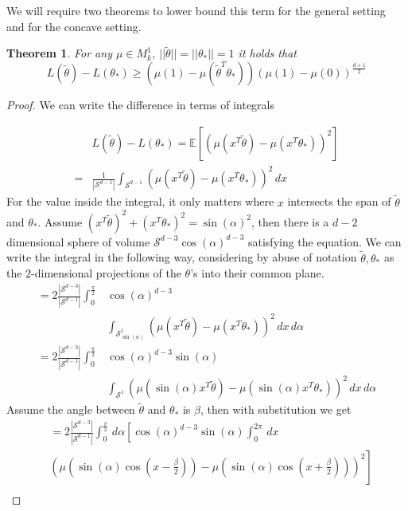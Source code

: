 \documentclass[twoside]{article} \usepackage{aistats2017}
\newcommand{\EV}[1] {
  \mathbb{E}\left[#1\right]}
\newtheorem{theorem}{Theorem}
\begin{document}
We will require two theorems to lower bound this term for the general setting and for the concave setting.
\begin{theorem}
For any $\mu \in M_k^1$, $||\tilde{\theta}||=||\theta_*||=1$ it holds that
$$L(\tilde{\theta})-L(\theta_*) \geq (\mu(1)-\mu(\tilde{\theta}^T\theta_*))(\mu(1)-\mu(0))^{\frac{d+1}{2}}$$
\end{theorem}
\begin{proof}
We can write the difference in terms of integrals

\begin{align*}
    &L(\tilde{\theta})-L(\theta_*)=\EV{(\mu(x^T\tilde{\theta})-\mu(x^T\theta_*))^2}\\
    =&\frac{1}{|\mathcal{S}^{d-1}|}\int_{\mathcal{S}^{d-1}}\left(\mu(x^T\tilde{\theta})-\mu(x^T\theta_*)\right)^2\, dx
\end{align*}
For the value inside the integral, it only matters where $x$ intersects the span of $\tilde{\theta}$ and $\theta_*$. Assume $(x^T\tilde{\theta})^2+(x^T\theta_*)^2 = \sin(\alpha)^2$, then there is a $d-2$ dimensional sphere of volume $\mathcal{S}^{d-3}\cos(\alpha)^{d-3}$ satisfying the equation. We can write the integral in the following way, considering by abuse of notation $\tilde{\theta},\theta_*$ as the $2$-dimensional projections of the $\theta$'s into their common plane.
\begin{align*}
    =2\frac{|\mathcal{S}^{d-3}|}{|\mathcal{S}^{d-1}|}\int_{0}^{\frac{\pi}{2}}&\cos(\alpha)^{d-3}\\
    &\int_{\mathcal{S}^1_{\sin(\alpha)}}\left(\mu(x^T\tilde{\theta})-\mu(x^T\theta_*)\right)^2\, dx\,d\alpha\nonumber\\
    =2\frac{|\mathcal{S}^{d-3}|}{|\mathcal{S}^{d-1}|}\int_{0}^{\frac{\pi}{2}}&\cos(\alpha)^{d-3}\sin(\alpha)\nonumber\\
    &\int_{\mathcal{S}^1}\left(\mu(\sin(\alpha)x^T\tilde{\theta})-\mu(\sin(\alpha)x^T\theta_*)\right)^2\, dx\,d\alpha\nonumber
\end{align*}    
    Assume the angle between $\tilde{\theta}$ and $\theta_*$ is $\beta$, then with substitution we get
    \begin{align}
        &=2\frac{|\mathcal{S}^{d-3}|}{|\mathcal{S}^{d-1}|}\int_{0}^{\frac{\pi}{2}}\,d\alpha\left[\cos(\alpha)^{d-3}\sin(\alpha)\int_{0}^{2\pi}\, dx\right.\nonumber\\
    &\left.\left(\mu(\sin(\alpha)\cos(x-\frac{\beta}{2}))-\mu(\sin(\alpha)\cos(x+\frac{\beta}{2}))\right)^2\right]\nonumber\\

\end{align}
\end{proof}
\end{document}
